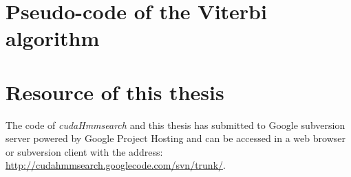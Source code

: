 
\chapter{Pseudo-code of the Viterbi algorithm} %
\label{appendixPV}


\chapter{Resource of this thesis} %

\label{AppendixA} %


The code of \emph{cudaHmmsearch} and this thesis has submitted to Google subversion server powered by Google Project Hosting and can be accessed in a web browser or subversion client with the address:
\url{http://cudahmmsearch.googlecode.com/svn/trunk/}.


